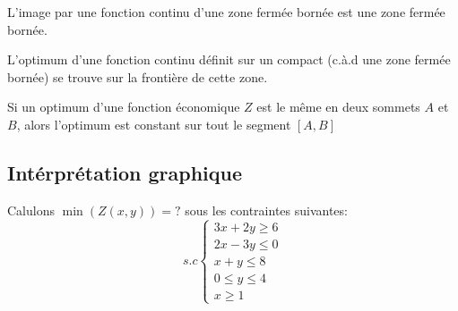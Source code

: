 \begin{theor}
L'image par une fonction continu d'une zone fermée bornée est une zone fermée
bornée.
\end{theor}

\begin{theor}
L'optimum d'une fonction continu définit sur un compact (c.à.d une zone fermée
bornée) se trouve sur la frontière de cette zone.
\end{theor}

\begin{theor}
Si un optimum d'une fonction économique $Z$ est le même en deux sommets $A$ et
$B$, alors l'optimum est constant sur tout le segment $[A,B]$
\end{theor}

\subsection{Intérprétation graphique}
Calulons $\min(Z(x,y))=?$ sous les contraintes suivantes:
\begin{equation*}
  s.c
    \begin{cases}
      3x + 2y \geq 6 \\
      2x - 3y \leq 0 \\
      x + y \leq 8 \\
      0 \leq y \leq 4 \\
      x \geq 1
    \end{cases}
\end{equation*}

